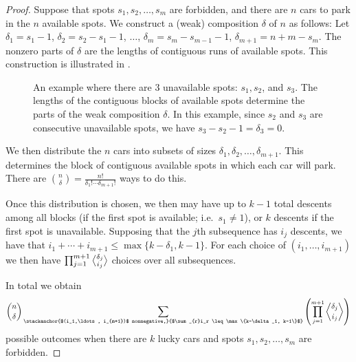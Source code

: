 \documentclass[reqno]{amsart}
\theoremstyle{definition}
\theoremstyle{remark}
\begin{document}
\begin{proof}


Suppose that spots $s_1, s_2, \ldots, s_m$ are forbidden, and there are $n$ cars to park in the $n$ available spots. We construct a (weak) composition $\delta$ of $n$ as follows: Let $\delta_1 = s_1-1$, $\delta_2 = s_2-s_1-1$, $\ldots$, $\delta_m = s_m-s_{m-1}-1$, $\delta_{m+1} = n+m - s_m$. The nonzero parts of $\delta$ are the lengths of contiguous runs of available spots. This construction is illustrated in .

\begin{figure}[!h]
    \centering
    \caption{An example where there are $3$ unavailable spots: $s_1, s_2$, and $s_3$. The lengths of the contiguous blocks of available spots determine the parts of the weak composition $\delta$. In this example, since $s_2$ and $s_3$ are consecutive unavailable spots, we have $s_3-s_2-1=\delta_3=0 $.}
    \label{fig:constructing composition}
\end{figure}

We then distribute the $n$ cars into subsets of sizes $\delta_1, \delta_2, \ldots, \delta_{m+1}$. This determines the block of contiguous available spots in which each car will park. 
There are $\binom{n }{\delta} = \frac{n!}{\delta_1! \cdots \delta_{m+1}!}$ ways to do this.


Once this distribution is chosen, we then may have up to $k-1$ total descents among all blocks (if the first spot is available; i.e.\ $s_1 \neq 1$), or $k$ descents if the first spot is unavailable. Supposing that the $j$th subsequence has $i_j$ descents, we have that $i_1 + \cdots + i_{m+1} \leq \max\{k-\delta_1, k-1\}$.
For each choice of $(i_1,\ldots, i_{m+1})$ we then have $\prod_{j=1}^{m+1} \genfrac{\langle}{\rangle}{0pt}{}{\delta_j}{i_j}$ choices over all subsequences.

In total we obtain
\[
\binom{n }{\delta}\sum_{\stackanchor{$(i_1,\ldots, i_{m+1})$ nonnegative,}{$\sum_{r}i_r \leq  \max\{k-\delta_1, k-1\}$}} \left( \prod_{j=1}^{m+1} \genfrac{\langle}{\rangle}{0pt}{}{\delta_j}{i_j} \right)
\]
possible outcomes when there are $k$ lucky cars and spots $s_1,s_2,\ldots,s_m$ are forbidden.
\end{proof}
\end{document}

